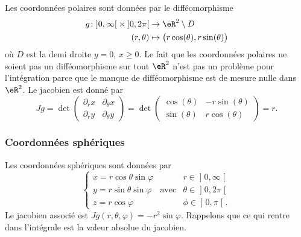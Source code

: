 Les coordonnées polaires sont données par le difféomorphisme
\begin{equation}
	\begin{aligned}
		g\colon \mathopen]0,\infty\mathclose[\times\mathopen]0,2\pi\mathclose[ &\to\eR^2\setminus D\\
		(r,\theta)&\mapsto \big( r\cos(\theta),r\sin(\theta) \big)
	\end{aligned}
\end{equation}
où $D$ est la demi droite $y=0$, $x\geq 0$. Le fait que les coordonnées polaires ne soient pas un difféomorphisme sur tout $\eR^2$ n'est pas un problème pour l'intégration parce que le manque de difféomorphisme est de mesure nulle dans $\eR^2$. Le jacobien est donné par
\begin{equation}
	Jg=\det\begin{pmatrix}
	\partial_rx	&	\partial_{\theta}x	\\ 
	\partial_ry	&	\partial_{\theta}y
\end{pmatrix}=\det\begin{pmatrix}
	\cos(\theta)	&	-r\sin(\theta)	\\ 
	\sin(\theta)	&	r\cos(\theta)	
\end{pmatrix}=r.
\end{equation}

					\subsubsection{Coordonnées sphériques}
\label{SubSubCoordSpJxhMwm}

Les coordonnées sphériques sont données par
\begin{equation}		\label{OMEqChmVarSpherique}
	\left\{
\begin{array}{lllll}
x=r\cos\theta\sin\varphi	&			&r\in\mathopen] 0 , \infty \mathclose[\\
y=r\sin\theta\sin\varphi	&	\text{avec}	&\theta\in\mathopen] 0 , 2\pi \mathclose[\\
z=r\cos\varphi			&			&\phi\in\mathopen] 0 , \pi \mathclose[.
\end{array}
\right.
\end{equation}
Le jacobien associé est $Jg(r,\theta,\varphi)=-r^2\sin\varphi$. Rappelons que ce qui rentre dans l'intégrale est la valeur absolue du jacobien.

